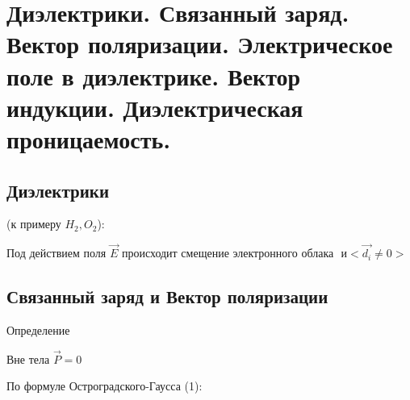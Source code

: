 \section{Диэлектрики. Связанный заряд. Вектор поляризации. Электрическое поле
в диэлектрике. Вектор индукции. Диэлектрическая проницаемость.}

\subsection*{Диэлектрики}

(к примеру $H_2,O_2$):



Под действием поля $\vec{E}$ происходит смещение электронного облака
 $\text{ и}<\vec{d_i}\neq0>$








\subsection*{Связанный заряд и Вектор поляризации}




Определение


Вне тела $\vec{P}=0$

\newpage


По формуле Остроградского-Гаусса (1):


